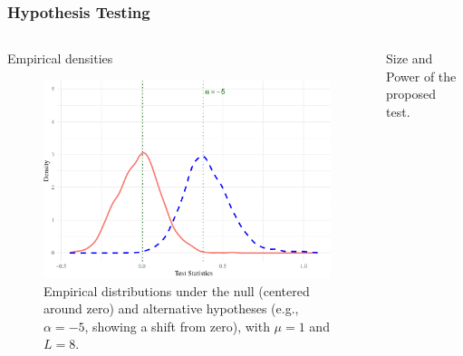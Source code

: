 \documentclass[aspectratio=1610,10pt]{beamer}
\begin{document}
\begin{frame} \frametitle{\large{Hypothesis Testing }}\vspace{0.5cm}

 \justifying
\begin{columns}[T,onlytextwidth]
    \begin{column}{.45\textwidth}
			\begin{block}{\small{\quad  \quad Empirical densities}}\justifying
				\begin{figure}[H] 
         \centering
         \includegraphics[scale=0.4]{./Figures/Plot_empirical_test-1} \vspace{-0.4cm}
        \caption*{\tiny{Empirical distributions under the null (centered around zero) and alternative hypotheses (e.g., $\alpha=-5$, showing a shift from zero), with $\mu=1$ and $L=8$.}}
    \end{figure}
		\end{block}
    \end{column}
\begin{column}{.52\textwidth}%
  \begin{block}{\small{\quad \quad Size and Power of the proposed test.}} %
		\justifying
				

\end{block}
\end{column}
\end{columns}
\end{frame}
\end{document}
